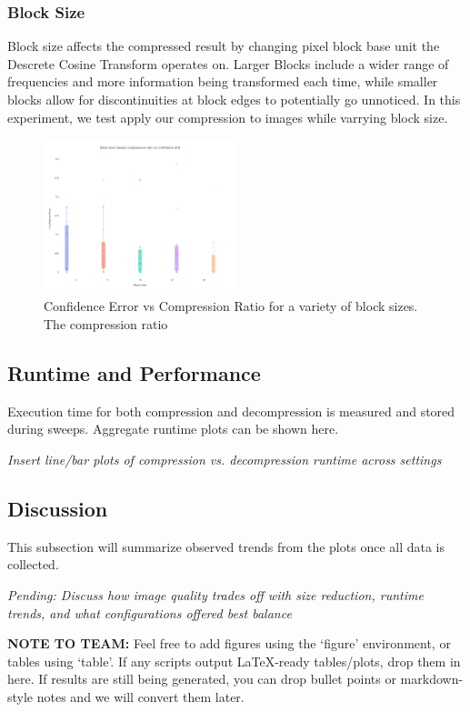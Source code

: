 \subsubsection{Block Size}

Block size affects the compressed result by changing pixel block base unit the Descrete Cosine Transform operates on.
Larger Blocks include a wider range of frequencies and more information being transformed each time, while smaller blocks allow for discontinuities at block edges to potentially go unnoticed.
In this experiment, we test apply our compression to images while varrying block size.

\begin{figure}
    \label{fig:block_size_sweep}
    \includegraphics[width=0.5\textwidth]{assets/Confidence Err Vs Block Size.png}
    \caption{Confidence Error vs Compression Ratio for a variety of block sizes. The compression ratio }
\end{figure}
\subsection{Runtime and Performance}
Execution time for both compression and decompression is measured and stored during sweeps. Aggregate runtime plots can be shown here.

\textit{Insert line/bar plots of compression vs. decompression runtime across settings}

\subsection{Discussion}
This subsection will summarize observed trends from the plots once all data is collected.

\textit{Pending: Discuss how image quality trades off with size reduction, runtime trends, and what configurations offered best balance}

\textbf{NOTE TO TEAM:} Feel free to add figures using the `figure' environment, or tables using `table'. If any scripts output LaTeX-ready tables/plots, drop them in here. If results are still being generated, you can drop bullet points or markdown-style notes and we will convert them later.

